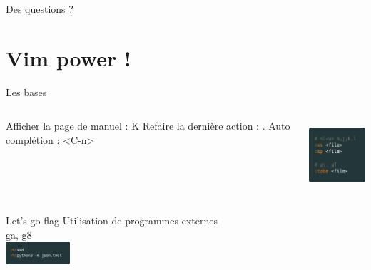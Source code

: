 \documentclass[10pt]{beamer}
\begin{document}
	\begin{frame}[standout]
		Des questions ?
	\end{frame}

\section{Vim power !}
	\begin{frame}{Les bases}
		\begin{columns}[C]
			\begin{column}{0.50\textwidth}
				\center
				Afficher la page de manuel : K
				Refaire la dernière action : .
				Auto complétion : <C-n>
			\end{column}
			\begin{column}{0.47\textwidth}
				\includegraphics[height=100]{img/splittin.png}\\
			\end{column}
		\end{columns}
	\end{frame}

	\begin{frame}{Let's go flag}
		Utilisation de programmes externes\\
		ga, g8\\
		\includegraphics[height=32]{img/tools.png}\\
	\end{frame}
\end{document}
